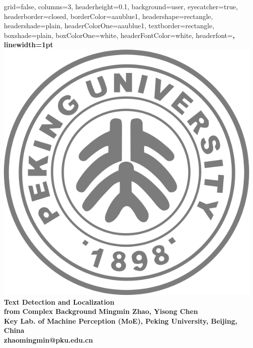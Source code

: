 \documentclass[a0paper,portrait]{baposter}
\begin{document}
\begin{poster}{
  grid=false,
  columns=3,
  headerheight=0.1\textheight,
  background=user,
  eyecatcher=true,
  headerborder=closed,
  borderColor=aaublue1,
  headershape=rectangle,
  headershade=plain,
  headerColorOne=aaublue1,
  textborder=rectangle,
  boxshade=plain,
  boxColorOne=white,
  headerFontColor=white,
  headerfont=\Large\sf\bf,
  linewidth=1pt
}
{
  \includegraphics[height=0.75\headerheight]{pku_neg}
}
{\color{white}\bf
  Text Detection and Localization \\from Complex Background
}
{\color{white}\bf
  \vspace{0.2em} Mingmin Zhao, Yisong Chen\\[0.2em]
  \color{white}\small
  Key Lab. of Machine Perception (MoE), Peking University, Beijing, China\\
  zhaomingmin@pku.edu.cn
}

\end{poster}
\end{document}

